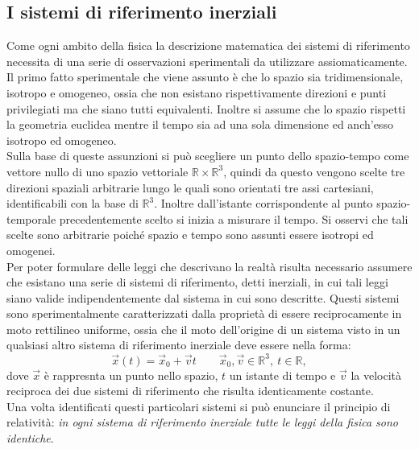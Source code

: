 \subsection{I sistemi di riferimento inerziali}
Come ogni ambito della fisica la descrizione matematica dei sistemi di riferimento necessita di una serie di osservazioni sperimentali da utilizzare assiomaticamente.\\

Il primo fatto sperimentale che viene assunto è che lo spazio sia tridimensionale, isotropo e omogeneo, ossia che non esistano rispettivamente direzioni e punti privilegiati ma che siano tutti equivalenti. Inoltre si assume che lo spazio rispetti la 
geometria euclidea mentre il tempo sia ad una sola dimensione ed anch'esso isotropo ed omogeneo.\\
Sulla base di queste assunzioni si può scegliere un punto dello spazio-tempo come 
vettore nullo di uno spazio vettoriale 
$\mathbb{R}\times\mathbb{R}^3$, quindi da questo vengono scelte tre direzioni spaziali arbitrarie lungo le quali sono orientati tre assi cartesiani, identificabili con la base di $\mathbb{R}^3$. 
Inoltre dall'istante corrispondente al punto spazio-temporale precedentemente scelto si inizia a misurare il tempo. Si osservi che tali scelte sono arbitrarie poiché spazio e tempo sono assunti essere isotropi ed omogenei.\\

Per poter formulare delle leggi che descrivano la realtà risulta necessario assumere che esistano una serie di sistemi di riferimento, detti inerziali, in cui tali leggi siano valide indipendentemente dal sistema in cui sono descritte. Questi sistemi sono sperimentalmente caratterizzati dalla proprietà di essere reciprocamente in moto rettilineo uniforme, ossia che il moto dell'origine di un sistema visto in un qualsiasi altro sistema di riferimento inerziale deve essere nella forma: 
\begin{equation}
	\vec x(t)=\vec x_0+\vec vt \qquad \vec x_0,\vec v\in \mathbb{R}^3, \ t\in\mathbb{R},
\end{equation}
dove $\vec x$ è rappresnta un punto nello spazio, $t$ un istante di tempo e $\vec v$ la velocità reciproca dei due sistemi di riferimento che risulta identicamente costante.\\
Una volta identificati questi particolari sistemi  si può enunciare il principio di relatività: \emph{in ogni sistema di riferimento inerziale tutte le leggi della fisica sono identiche}.\\

